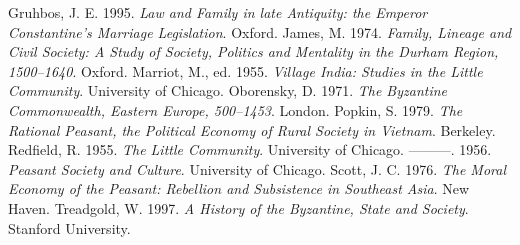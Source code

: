 \documentclass[a4paper,12pt,punct=kaiming,fontset=none]{ctexart}
\newcommand*{\entimes}{\CJKfamily{entimes}}
\begin{document}
\begin{thebibliography}{99}
 Gruhbos, J. E. 1995. \textit{Law and Family in late Antiquity: the Emperor Constantine’s Marriage Legislation}. Oxford.
 James, M. 1974. \textit{Family, Lineage and Civil Society: A Study of Society, Politics and Mentality in the Durham Region, 1500–1640}. Oxford.
 Marriot, M., ed. 1955. \textit{Village India: Studies in the Little Community}. University of Chicago.
 Oborensky, D. 1971. \textit{The Byzantine Commonwealth, Eastern Europe, 500–1453}. London.
 Popkin, S. 1979. \textit{The Rational Peasant, the Political Economy of Rural Society in Vietnam}. Berkeley.
 Redfield, R. 1955. \textit{The Little Community}. University of Chicago.
 \entimes———. 1956. \textit{Peasant Society and Culture}. University of Chicago.
 Scott, J. C. 1976. \textit{The Moral Economy of the Peasant: Rebellion and Subsistence in Southeast Asia}. New Haven.
 Treadgold, W. 1997. \textit{A History of the Byzantine, State and Society}. Stanford University.
\end{thebibliography}
\end{document}
